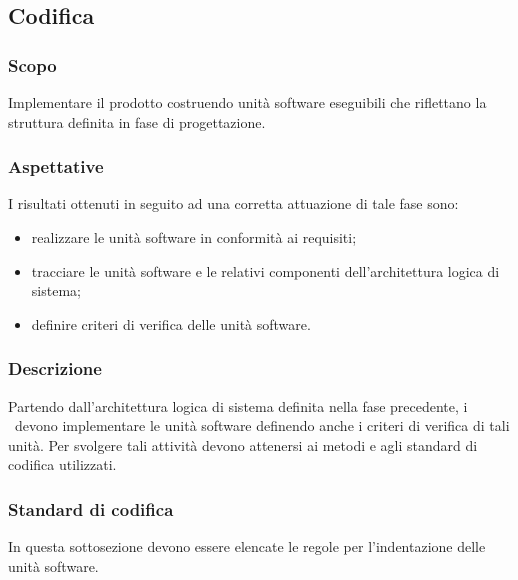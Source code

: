 \documentclass[../NormeDiProgetto.tex]{subfiles}
\begin{document}
		\subsection{Codifica}
			\subsubsection{Scopo}
				Implementare il prodotto costruendo unità software eseguibili che riflettano la struttura definita in fase di progettazione.
			\subsubsection{Aspettative}
				I risultati ottenuti in seguito ad una corretta attuazione di tale fase sono:
				\begin{itemize}
					\item realizzare le unità software in conformità ai requisiti;
					\item tracciare le unità software e le relativi componenti dell'architettura logica di sistema;
					\item definire criteri di verifica delle unità software.
				\end{itemize}
			\subsubsection{Descrizione}
				Partendo dall'architettura logica di sistema definita nella fase precedente, i \programmatori\ devono implementare le unità software definendo anche i criteri di verifica di tali unità. Per svolgere tali attività devono attenersi ai metodi e agli standard di codifica utilizzati.
			\subsubsection{Standard di codifica}
				In questa sottosezione devono essere elencate le regole per l'indentazione delle unità software.
\end{document}
